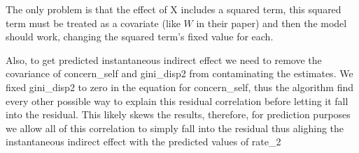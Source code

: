 \documentclass[
]{article}
\begin{document}
The only problem is that the effect of X includes a squared term, this
squared term must be treated as a covariate (like \(W\) in their paper)
and then the model should work, changing the squared term's fixed value
for each.

Also, to get predicted instantaneous indirect effect we need to remove
the covariance of concern\_self and gini\_disp2 from contaminating the
estimates. We fixed gini\_disp2 to zero in the equation for
concern\_self, thus the algorithm find every other possible way to
explain this residual correlation before letting it fall into the
residual. This likely skews the results, therefore, for prediction
purposes we allow all of this correlation to simply fall into the
residual thus alighing the instantaneous indirect effect with the
predicted values of rate\_2
\end{document}
